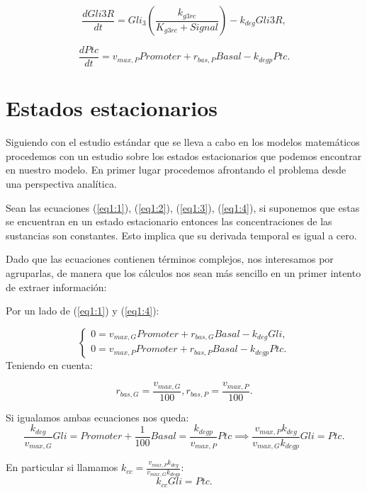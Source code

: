  \begin{equation}
 \frac{dGli3R}{dt}= Gli_3\left(\frac{k_{g3rc}}{K_{g3rc}+Signal}\right)-k_{deg}Gli3R,
 \label{eq1:3}
 \end{equation}
 
 \begin{equation}
 \frac{dPtc}{dt} = v_{max,P}Promoter+r_{bas,P}Basal-k_{degp}Ptc.
 \label{eq1:4}
 \end{equation}
 
\section{Estados estacionarios}\label{apartado2.4}
Siguiendo con el estudio estándar que se lleva a cabo en los modelos matemáticos procedemos con un estudio sobre los estados estacionarios que podemos encontrar en nuestro modelo. En primer lugar procedemos afrontando el problema desde una perspectiva analítica. 

Sean las ecuaciones (\ref{eq1:1}), (\ref{eq1:2}), (\ref{eq1:3}), (\ref{eq1:4}), si suponemos que estas se encuentran en un estado estacionario entonces las concentraciones de las sustancias son constantes. Esto implica que su derivada temporal es igual a cero.

Dado que las ecuaciones contienen términos complejos, nos interesamos por agruparlas, de manera que los cálculos nos sean más sencillo en un primer intento de extraer información:

Por un lado de (\ref{eq1:1}) y (\ref{eq1:4}):

$$\begin{cases} 0 = v_{max,G}Promoter+r_{bas,G}Basal-k_{deg}Gli, \\0= v_{max,P}Promoter+r_{bas,P}Basal-k_{degp}Ptc. \end{cases}$$
Teniendo en cuenta:

$$
r_{bas,G}=\frac{v_{max,G}}{100},r_{bas,P}=\frac{v_{max,P}}{100}.
$$

Si igualamos ambas ecuaciones nos queda:
\begin{equation*}
\frac{k_{deg}}{v_{max,G}}Gli=Promoter+\frac{1}{100}Basal=\frac{k_{degp}}{v_{max,P}}Ptc \implies \frac{v_{max,P}k_{deg}}{v_{max,G}k_{degp}}Gli=Ptc.
\end{equation*}

 En particular si llamamos $k_{cc}=\frac{v_{max,P}k_{deg}}{v_{max,G}k_{degp}}$:
 \begin{equation}
k_{cc}Gli=Ptc.
\label{gli-ptc}
 \end{equation}


